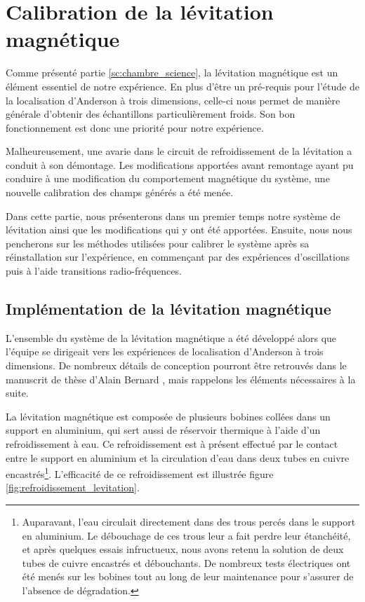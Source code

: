 \section{Calibration de la lévitation magnétique}
\label{sc:levitation}
Comme présenté partie \ref{sc:chambre_science}, la lévitation magnétique est un élément essentiel de notre expérience. En plus d'être un pré-requis pour l'étude de la localisation d'Anderson à trois dimensions, celle-ci nous permet de manière générale d'obtenir des échantillons particulièrement froids. Son bon fonctionnement est donc une priorité pour notre expérience.

Malheureusement, une avarie dans le circuit de refroidissement de la lévitation a conduit à son démontage. Les modifications apportées avant remontage ayant pu conduire à une modification du comportement magnétique du système, une nouvelle calibration des champs générés a été menée.

Dans cette partie, nous présenterons dans un premier temps notre système de lévitation ainsi que les modifications qui y ont été apportées. Ensuite, nous nous pencherons sur les méthodes utilisées pour calibrer le système après sa réinstallation sur l'expérience, en commençant par des expériences d'oscillations puis à l'aide transitions radio-fréquences.




\subsection{Implémentation de la lévitation magnétique}

L'ensemble du système de la lévitation magnétique a été développé alors que l'équipe se dirigeait vers les expériences de localisation d'Anderson à trois dimensions. De nombreux détails de conception pourront être retrouvés dans le manuscrit de thèse d'Alain Bernard \citep{bernard2010transport}, mais rappelons les éléments nécessaires à la suite.

La lévitation magnétique est composée de plusieurs bobines collées dans un support en aluminium, qui sert aussi de réservoir thermique à l'aide d'un refroidissement à eau. Ce refroidissement est à présent effectué par le contact entre le support en aluminium et la circulation d'eau dans deux tubes en cuivre encastrés\footnote{Auparavant, l'eau circulait directement dans des trous percés dans le support en aluminium. Le débouchage de ces trous leur a fait perdre leur étanchéité, et après quelques essais infructueux, nous avons retenu la solution de deux tubes de cuivre encastrés et débouchants. De nombreux tests électriques ont été menés sur les bobines tout au long de leur maintenance pour s'assurer de l'absence de dégradation.}. L'efficacité de ce refroidissement est illustrée figure \ref{fig:refroidissement_levitation}.

